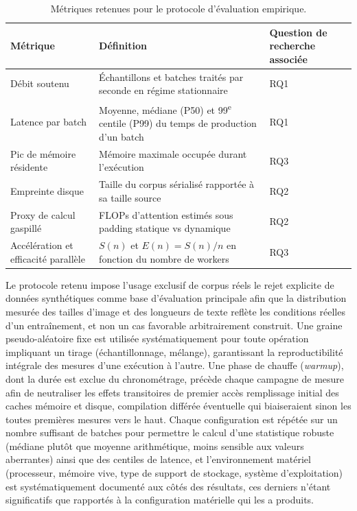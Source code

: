 \documentclass[12pt,a4paper]{report}
\begin{document}
\begin{table}[htbp]
  \centering
  \renewcommand{\arraystretch}{1.5}
  \begin{tabular}{|p{4.5cm}|p{5.5cm}|p{4.5cm}|}
    \hline
    \textbf{Métrique} & \textbf{Définition} & \textbf{Question de recherche associée} \\
    \hline
    Débit soutenu & Échantillons et batches traités par seconde en régime stationnaire & RQ1 \\
    \hline
    Latence par batch & Moyenne, médiane (P50) et 99\textsuperscript{e} centile (P99) du temps de production d'un batch & RQ1 \\
    \hline
    Pic de mémoire résidente & Mémoire maximale occupée durant l'exécution & RQ3 \\
    \hline
    Empreinte disque & Taille du corpus sérialisé rapportée à sa taille source & RQ2 \\
    \hline
    Proxy de calcul gaspillé & FLOPs d'attention estimés sous padding statique vs dynamique & RQ2 \\
    \hline
    Accélération et efficacité parallèle & $S(n)$ et $E(n) = S(n)/n$ en fonction du nombre de workers & RQ3 \\
    \hline
  \end{tabular}
  \vspace{0.2cm}
  \caption{Métriques retenues pour le protocole d'évaluation empirique.}
  \label{tab:metriques}
\end{table}

Le protocole retenu impose l'usage exclusif de corpus réels le rejet explicite de données synthétiques comme base d'évaluation principale afin que la distribution mesurée des tailles d'image et des longueurs de texte reflète les conditions réelles d'un entraînement, et non un cas favorable arbitrairement construit. Une graine pseudo-aléatoire fixe est utilisée systématiquement pour toute opération impliquant un tirage (échantillonnage, mélange), garantissant la reproductibilité intégrale des mesures d'une exécution à l'autre. Une phase de chauffe (\textit{warmup}), dont la durée est exclue du chronométrage, précède chaque campagne de mesure afin de neutraliser les effets transitoires de premier accès remplissage initial des caches mémoire et disque, compilation différée éventuelle qui biaiseraient sinon les toutes premières mesures vers le haut. Chaque configuration est répétée sur un nombre suffisant de batches pour permettre le calcul d'une statistique robuste (médiane plutôt que moyenne arithmétique, moins sensible aux valeurs aberrantes) ainsi que des centiles de latence, et l'environnement matériel (processeur, mémoire vive, type de support de stockage, système d'exploitation) est systématiquement documenté aux côtés des résultats, ces derniers n'étant significatifs que rapportés à la configuration matérielle qui les a produits.
\end{document}
